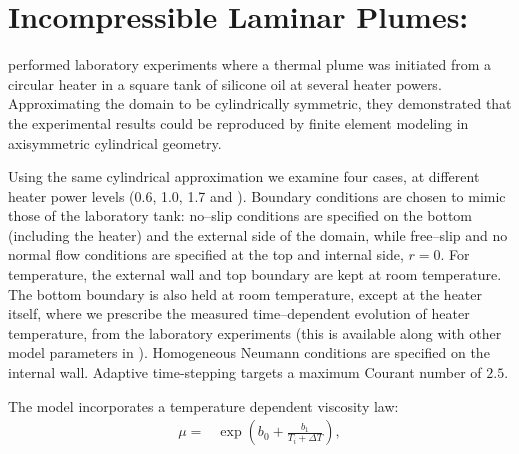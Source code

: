 %
%
%
%
%

\chapter{Incompressible Laminar Plumes: \citeauthor{VattevilleG32009}} \label{sec:vatteville}

\citet{VattevilleG32009} performed laboratory experiments where 
a thermal plume was initiated from a circular heater 
in a square tank of silicone oil at several heater
powers.  Approximating the domain to be cylindrically symmetric, they
demonstrated that the experimental results could be reproduced 
by finite element modeling in axisymmetric cylindrical geometry.

Using the same cylindrical approximation we examine four cases, at
different heater power levels (0.6, 1.0, 1.7 and \W[3.3]). Boundary
conditions are chosen to mimic those of the laboratory tank: no--slip
conditions are specified on the bottom (including the heater) and the
external side of the domain, while free--slip and no normal flow
conditions are specified at the top and internal side, $r=0$. For
temperature, the external wall and top boundary are kept at room
temperature. The bottom boundary is also held at room temperature,
except at the heater itself, where we prescribe the measured
time--dependent evolution of heater temperature, from the laboratory
experiments (this is available along with other model parameters in
\citet{VattevilleG32009}). Homogeneous Neumann conditions are
specified on the internal wall.  Adaptive time-stepping targets a
maximum Courant number of $2.5$.

The  model incorporates a temperature dependent viscosity law:
\begin{align}
\mu =& \exp\left(b_0 + \frac{b_1}{T_i+\Delta T}\right), %
\end{align}

